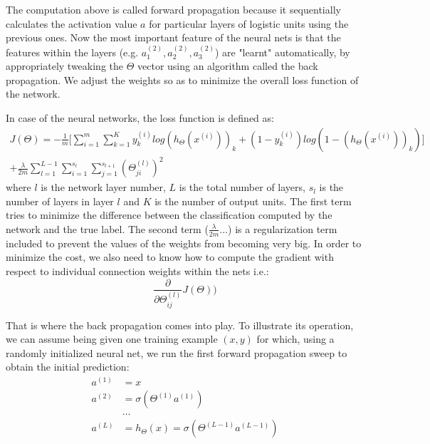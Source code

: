 \documentclass[a4paper, 12pt]{article}
\numberwithin{equation}{section}
\begin{document}
	The computation above is called forward propagation because it sequentially calculates the activation value $a$ for particular layers of logistic units using the previous ones. Now the most important feature of the neural nets is that the features within the layers (e.g. $a_1^{(2)}, a_2^{(2)}, a_3^{(2)}$) are "learnt" automatically, by appropriately tweaking the $\Theta$ vector using an algorithm called the back propagation. We adjust the weights so as to minimize the overall loss function of the network.

	In case of the neural networks, the loss function is defined as:
	\begin{align*}
	J(\Theta) = - \frac{1}{m} \Bigg[\sum_{i=1}^{m} \sum_{k=1}^{K} y_k^{(i)}log(h_\Theta(x^{(i)}))_k + (1-y_k^{(i)}) log(1-(h_\Theta(x^{(i)}))_k) \Bigg] \\+ \frac{\lambda}{2m} \sum_{l=1}^{L-1} \sum_{i=1}^{s_l} \sum_{j=1}^{s_{l+1}} (\Theta _ {ji} ^{(l)})^2
	\end{align*}
	where $l$ is the network layer number, $L$ is the total number of layers, $s_l$ is the number of layers in layer $l$ and $K$ is the number of output units. The first term tries to minimize the difference between the classification computed by the network and the true label. The second term ($\frac{\lambda}{2m} \ldots$) is a regularization term included to prevent the values of the weights from becoming very big.
	In order to minimize the cost, we also need to know how to compute the gradient with respect to individual connection weights within the nets i.e.:
	\begin{equation}
	\frac{\partial}{\partial \Theta_{ij}^{(l)}} J(\Theta))
	\end{equation}

	That is where the back propagation comes into play. To illustrate its operation, we can assume being given one training example $(x, y)$ for which, using a randomly initialized neural net, we run the first forward propagation sweep to obtain the initial prediction:
	\begin{align}
	a^{(1)} &= x \\
	a^{(2)} &= \sigma(\Theta^{(1)} a^{(1)}) \\
	&\ldots \\
	a^{(L)} &= h_{\Theta}(x)= \sigma(\Theta^{(L-1)} a^{(L-1)})
	\end{align}
\end{document}

